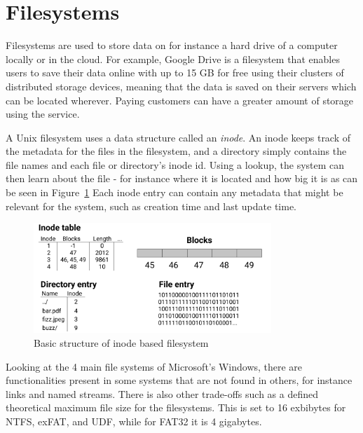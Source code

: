 \section{Filesystems}
Filesystems are used to store data on for instance a hard drive of a computer locally or in the cloud. For example, Google Drive is a filesystem that enables users to save their data online with up to 15 GB for free\cite{CloudStorageWork} using their clusters of distributed storage devices, meaning that the data is saved on their servers which can be located wherever\cite{DistributedStorageWhat}. Paying customers can have a greater amount of storage using the service.

A Unix filesystem uses a data structure called an \textit{inode}. An inode keeps track of the metadata for the files in the filesystem, and a directory simply contains the file names and each file or directory's inode id. Using a lookup, the system can then learn about the file - for instance where it is located and how big it is as can be seen in Figure~\ref{fig:inode_diag} %
Each inode entry can contain any metadata that might be relevant for the system, such as creation time and last update time.

\begin{figure}[!ht]
	\begin{center}
	  \includegraphics[width=0.8\textwidth]{figures/inode_diagram.png}
	\end{center}
	\caption{Basic structure of inode based filesystem}
	\label{fig:inode_diag}
\end{figure}

Looking at the 4 main file systems of Microsoft's Windows, there are functionalities present in some systems that are not found in others, for instance links and named streams. There is also other trade-offs such as a defined theoretical maximum file size\cite{mikbenFileSystemFunctionality} for the filesystems. This is set to 16 exbibytes for NTFS, exFAT, and UDF, while for FAT32 it is 4 gigabytes. 

